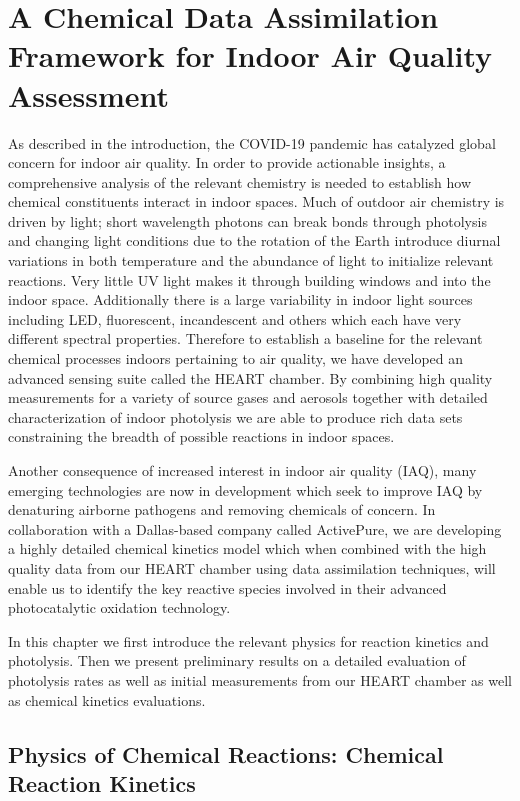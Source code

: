 \chapter{A Chemical Data Assimilation Framework for Indoor Air Quality Assessment}

As described in the introduction, the COVID-19 pandemic has catalyzed global concern for indoor air quality. In order to provide actionable insights, a comprehensive analysis of the relevant chemistry is needed to establish how chemical constituents interact in indoor spaces. Much of outdoor air chemistry is driven by light; short wavelength photons can break bonds through photolysis and changing light conditions due to the rotation of the Earth introduce diurnal variations in both temperature and the abundance of light to initialize relevant reactions. Very little UV light makes it through building windows and into the indoor space. Additionally there is a large variability in indoor light sources including LED, fluorescent, incandescent and others which each have very different spectral properties. Therefore to establish a baseline for the relevant chemical processes indoors pertaining to air quality, we have developed an advanced sensing suite called the HEART chamber. By combining high quality measurements for a variety of source gases and aerosols together with detailed characterization of indoor photolysis we are able to produce rich data sets constraining the breadth of possible reactions in indoor spaces.

Another consequence of increased interest in indoor air quality (IAQ), many emerging technologies are now in development which seek to improve IAQ by denaturing airborne pathogens and removing chemicals of concern. In collaboration with a Dallas-based company called ActivePure, we are developing a highly detailed chemical kinetics model which when combined with the high quality data from our HEART chamber using data assimilation techniques, will enable us to identify the key reactive species involved in their advanced photocatalytic oxidation technology.

In this chapter we first introduce the relevant physics for reaction kinetics and photolysis. Then we present preliminary results on a detailed evaluation of photolysis rates as well as initial measurements from our HEART chamber as well as chemical kinetics evaluations.

\section{Physics of Chemical Reactions: Chemical Reaction Kinetics}

